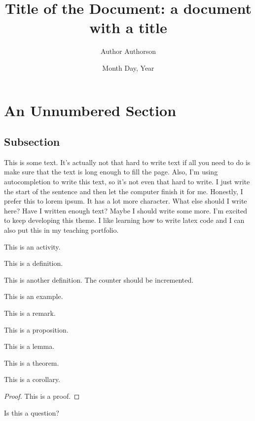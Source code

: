 \documentclass{article}
\begin{document}
\title{Title of the Document: a document with a title}
\author{Author Authorson}
\date{Month Day, Year}

\maketitle

\section*{An Unnumbered Section}
\subsection*{Subsection}

This is some text. It's actually not that hard to write text if all you need to do is make sure that the text is long enough to fill the page. Also, I'm using autocompletion to write this text, so it's not even that hard to write. I just write the start of the sentence and then let the computer finish it for me. Honestly, I prefer this to lorem ipsum. It has a lot more character. What else should I write here? Have I written enough text? Maybe I should write some more. I'm excited to keep developing this theme. I like learning how to write latex code and I can also put this in my teaching portfolio.

\begin{activity}
This is an activity.
\end{activity}

\begin{definition}
    This is a definition.
\end{definition}

\begin{definition}
    This is another definition. The counter should be incremented.
\end{definition}

\begin{example}
    This is an example.
\end{example}

\begin{remark}
    This is a remark.
\end{remark}

\begin{proposition}
    This is a proposition.
\end{proposition}

\begin{lemma}
    This is a lemma.
\end{lemma}

\begin{theorem}
    This is a theorem.
\end{theorem}


\begin{corollary}
    This is a corollary.
\end{corollary}

\begin{proof}
    This is a proof.
\end{proof}

\begin{question}
    Is this a question?
\end{question}
\end{document}
